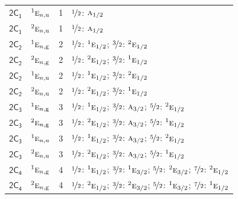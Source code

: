 \documentclass[10pt,a4paper]{article}
\numberwithin{equation}{section}
\newcommand{\grp}[1]{\mathsf{#1}}
\newcommand{\irr}[1]{\text{\normalfont\scshape #1}}
\newcommand{\conjpair}[1]{{}^{#1}}
\newcommand{\ptag}[1]{\mathrm{#1}}
\newlength{\fillwidth}\newlength{\cellwidth}\newlength{\colwidth}
\begin{document}
{\begin{longtable}{@{}llr>{\RaggedRight\arraybackslash}p{\fillwidth}@{}}
\href{2C1.pdf}{$\grp{2C_{1}}$} & $\conjpair{1}\irr{e}_{n,\ptag{u}}$ & 1 & $\nicefrac{1}{2}$: $\irr{a}_{1/2}$\\
\href{2C1.pdf}{$\grp{2C_{1}}$} & $\conjpair{2}\irr{e}_{n,\ptag{u}}$ & 1 & $\nicefrac{1}{2}$: $\irr{a}_{1/2}$\\
\href{2C2.pdf}{$\grp{2C_{2}}$} & $\conjpair{1}\irr{e}_{n,\ptag{g}}$ & 2 & $\nicefrac{1}{2}$: $\conjpair{1}\irr{e}_{1/2}$; $\nicefrac{3}{2}$: $\conjpair{2}\irr{e}_{1/2}$\\
\href{2C2.pdf}{$\grp{2C_{2}}$} & $\conjpair{2}\irr{e}_{n,\ptag{g}}$ & 2 & $\nicefrac{1}{2}$: $\conjpair{2}\irr{e}_{1/2}$; $\nicefrac{3}{2}$: $\conjpair{1}\irr{e}_{1/2}$\\
\href{2C2.pdf}{$\grp{2C_{2}}$} & $\conjpair{1}\irr{e}_{n,\ptag{u}}$ & 2 & $\nicefrac{1}{2}$: $\conjpair{1}\irr{e}_{1/2}$; $\nicefrac{3}{2}$: $\conjpair{2}\irr{e}_{1/2}$\\
\href{2C2.pdf}{$\grp{2C_{2}}$} & $\conjpair{2}\irr{e}_{n,\ptag{u}}$ & 2 & $\nicefrac{1}{2}$: $\conjpair{2}\irr{e}_{1/2}$; $\nicefrac{3}{2}$: $\conjpair{1}\irr{e}_{1/2}$\\
\href{2C3.pdf}{$\grp{2C_{3}}$} & $\conjpair{1}\irr{e}_{n,\ptag{g}}$ & 3 & $\nicefrac{1}{2}$: $\conjpair{1}\irr{e}_{1/2}$; $\nicefrac{3}{2}$: $\irr{a}_{3/2}$; $\nicefrac{5}{2}$: $\conjpair{2}\irr{e}_{1/2}$\\
\href{2C3.pdf}{$\grp{2C_{3}}$} & $\conjpair{2}\irr{e}_{n,\ptag{g}}$ & 3 & $\nicefrac{1}{2}$: $\conjpair{2}\irr{e}_{1/2}$; $\nicefrac{3}{2}$: $\irr{a}_{3/2}$; $\nicefrac{5}{2}$: $\conjpair{1}\irr{e}_{1/2}$\\
\href{2C3.pdf}{$\grp{2C_{3}}$} & $\conjpair{1}\irr{e}_{n,\ptag{u}}$ & 3 & $\nicefrac{1}{2}$: $\conjpair{1}\irr{e}_{1/2}$; $\nicefrac{3}{2}$: $\irr{a}_{3/2}$; $\nicefrac{5}{2}$: $\conjpair{2}\irr{e}_{1/2}$\\
\href{2C3.pdf}{$\grp{2C_{3}}$} & $\conjpair{2}\irr{e}_{n,\ptag{u}}$ & 3 & $\nicefrac{1}{2}$: $\conjpair{2}\irr{e}_{1/2}$; $\nicefrac{3}{2}$: $\irr{a}_{3/2}$; $\nicefrac{5}{2}$: $\conjpair{1}\irr{e}_{1/2}$\\
\href{2C4.pdf}{$\grp{2C_{4}}$} & $\conjpair{1}\irr{e}_{n,\ptag{g}}$ & 4 & $\nicefrac{1}{2}$: $\conjpair{1}\irr{e}_{1/2}$; $\nicefrac{3}{2}$: $\conjpair{1}\irr{e}_{3/2}$; $\nicefrac{5}{2}$: $\conjpair{2}\irr{e}_{3/2}$; $\nicefrac{7}{2}$: $\conjpair{2}\irr{e}_{1/2}$\\
\href{2C4.pdf}{$\grp{2C_{4}}$} & $\conjpair{2}\irr{e}_{n,\ptag{g}}$ & 4 & $\nicefrac{1}{2}$: $\conjpair{2}\irr{e}_{1/2}$; $\nicefrac{3}{2}$: $\conjpair{2}\irr{e}_{3/2}$; $\nicefrac{5}{2}$: $\conjpair{1}\irr{e}_{3/2}$; $\nicefrac{7}{2}$: $\conjpair{1}\irr{e}_{1/2}$\\

\end{longtable}}
\end{document}
